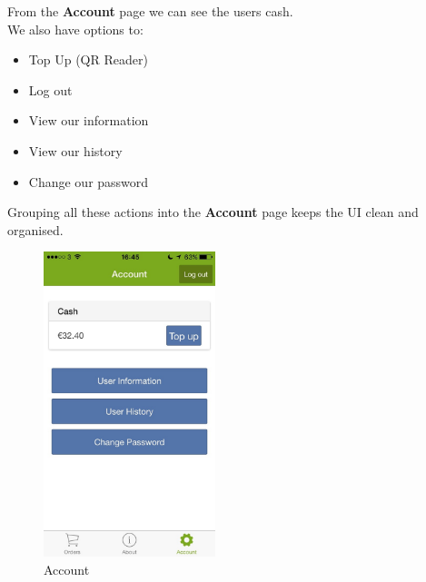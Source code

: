 \begin{minipage}{0.55\textwidth}
From the \textbf{Account} page we can see the users cash.
\\
We also have options to:
	\begin{itemize}
		\item Top Up (QR Reader)
		\item Log out
		\item View our information
		\item View our history
		\item Change our  password
	\end{itemize}

Grouping all these actions into the \textbf{Account} page keeps the UI clean and organised.

\end{minipage}
\begin{minipage}{5cm}
	\begin{figure}[H]
		\includegraphics[width=5cm]{img/mobile-app/screen-shots/IMG_2914.jpg}
		\caption{Account}
	\end{figure}
\end{minipage} \hfill

